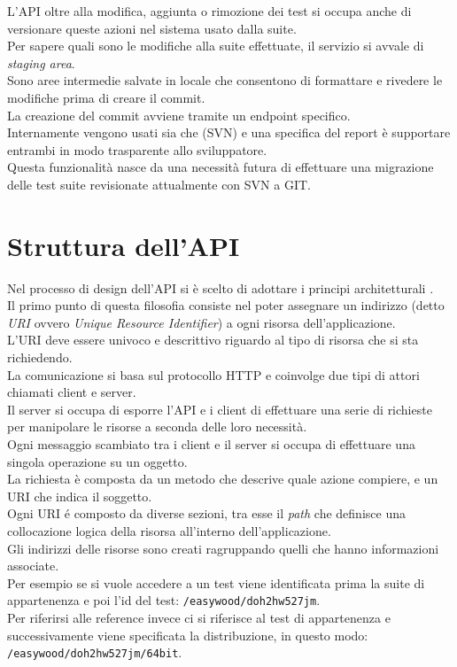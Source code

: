         L'API oltre alla modifica, aggiunta o rimozione dei test si occupa anche di versionare queste azioni nel sistema usato dalla suite.\\
        Per sapere quali sono le modifiche alla suite effettuate, il servizio si avvale di \textit{staging area}. \\
        Sono aree intermedie salvate in locale che consentono di formattare e rivedere le modifiche prima di creare il commit.\\
        La creazione del commit avviene tramite un endpoint specifico. \\

        Internamente vengono usati sia \cite{Git} che \cite{SubVersion} (SVN) e una specifica del report è supportare entrambi in modo trasparente allo sviluppatore.\\
        Questa funzionalità nasce da una necessità futura di effettuare una migrazione delle test suite revisionate attualmente con SVN a GIT.\\
            
    \section{Struttura dell'API}
        Nel processo di design dell'API si è scelto di adottare i principi architetturali \cite{REST}.\\
        Il primo punto di questa filosofia consiste nel poter assegnare un indirizzo (detto \textit{URI} ovvero \textit{Unique Resource Identifier}) a ogni risorsa dell'applicazione.\\
        L'URI deve essere univoco e descrittivo riguardo al tipo di risorsa che si sta richiedendo.\\
        
        La comunicazione si basa sul protocollo HTTP e coinvolge due tipi di attori chiamati client e server.\\
        Il server si occupa di esporre l'API e i client di effettuare una serie di richieste per manipolare le risorse a seconda delle loro necessità.\\
        Ogni messaggio scambiato tra i client e il server si occupa di effettuare una singola operazione su un oggetto.\\
        La richiesta è composta da un metodo che descrive quale azione compiere, e un URI che indica il soggetto.\\
        
        Ogni URI \'e composto da diverse sezioni, tra esse il \textit{path} che definisce una collocazione logica della risorsa all'interno dell'applicazione.\\
        Gli indirizzi delle risorse sono creati ragruppando quelli che hanno informazioni associate.\\
        Per esempio se si vuole accedere a un test viene identificata prima la suite di appartenenza e poi l'id del test: \verb|/easywood/doh2hw527jm|.\\
        Per riferirsi alle reference invece ci si riferisce al test di appartenenza e successivamente viene specificata la distribuzione, in questo modo: \verb|/easywood/doh2hw527jm/64bit|.\\
        
